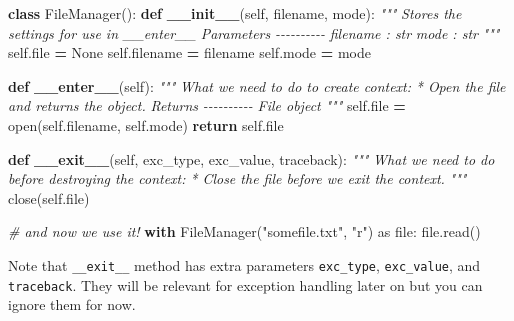 \documentclass[
]{book}
\newenvironment{Shaded}{\begin{snugshade}}{\end{snugshade}}
\newcommand{\BuiltInTok}[1]{#1}
\newcommand{\CommentTok}[1]{\textcolor[rgb]{0.56,0.35,0.01}{\textit{#1}}}
\newcommand{\ControlFlowTok}[1]{\textcolor[rgb]{0.13,0.29,0.53}{\textbf{#1}}}
\newcommand{\FunctionTok}[1]{\textcolor[rgb]{0.13,0.29,0.53}{\textbf{#1}}}
\newcommand{\ImportTok}[1]{#1}
\newcommand{\KeywordTok}[1]{\textcolor[rgb]{0.13,0.29,0.53}{\textbf{#1}}}
\newcommand{\NormalTok}[1]{#1}
\newcommand{\OperatorTok}[1]{\textcolor[rgb]{0.81,0.36,0.00}{\textbf{#1}}}
\newcommand{\StringTok}[1]{\textcolor[rgb]{0.31,0.60,0.02}{#1}}
\newcommand{\VariableTok}[1]{\textcolor[rgb]{0.00,0.00,0.00}{#1}}
\begin{document}
\begin{Shaded}
\begin{Highlighting}[]
\KeywordTok{class}\NormalTok{ FileManager():}
    \KeywordTok{def} \FunctionTok{\_\_init\_\_}\NormalTok{(}\VariableTok{self}\NormalTok{, filename, mode):}
        \CommentTok{"""}
\CommentTok{        Stores the settings for use in \_\_enter\_\_}
\CommentTok{        }
\CommentTok{        Parameters}
\CommentTok{        {-}{-}{-}{-}{-}{-}{-}{-}{-}{-}}
\CommentTok{        filename : str}
\CommentTok{        mode : str}
\CommentTok{        """}
        \VariableTok{self}\NormalTok{.}\BuiltInTok{file} \OperatorTok{=} \VariableTok{None}
        \VariableTok{self}\NormalTok{.filename }\OperatorTok{=}\NormalTok{ filename}
        \VariableTok{self}\NormalTok{.mode }\OperatorTok{=}\NormalTok{ mode}
        
    \KeywordTok{def} \FunctionTok{\_\_enter\_\_}\NormalTok{(}\VariableTok{self}\NormalTok{):}
      \CommentTok{""" }
\CommentTok{      What we need to do to create context:}
\CommentTok{        * Open the file and returns the object.}
\CommentTok{      }
\CommentTok{      Returns}
\CommentTok{      {-}{-}{-}{-}{-}{-}{-}{-}{-}{-}}
\CommentTok{      File object}
\CommentTok{      """}
      \VariableTok{self}\NormalTok{.}\BuiltInTok{file} \OperatorTok{=} \BuiltInTok{open}\NormalTok{(}\VariableTok{self}\NormalTok{.filename, }\VariableTok{self}\NormalTok{.mode)}
      \ControlFlowTok{return} \VariableTok{self}\NormalTok{.}\BuiltInTok{file}
      
    \KeywordTok{def} \FunctionTok{\_\_exit\_\_}\NormalTok{(}\VariableTok{self}\NormalTok{, exc\_type, exc\_value, traceback):}
      \CommentTok{"""}
\CommentTok{      What we need to do before destroying the context:}
\CommentTok{        * Close the file before we exit the context.}
\CommentTok{      """}
\NormalTok{      close(}\VariableTok{self}\NormalTok{.}\BuiltInTok{file}\NormalTok{)}
      
\CommentTok{\# and now we use it!}
\ControlFlowTok{with}\NormalTok{ FileManager(}\StringTok{"somefile.txt"}\NormalTok{, }\StringTok{"r"}\NormalTok{) }\ImportTok{as} \BuiltInTok{file}\NormalTok{:}
    \BuiltInTok{file}\NormalTok{.read()}
\end{Highlighting}
\end{Shaded}

Note that \texttt{\_\_exit\_\_} method has extra parameters \texttt{exc\_type}, \texttt{exc\_value}, and \texttt{traceback}. They will be relevant for exception handling later on but you can ignore them for now.
\end{document}
